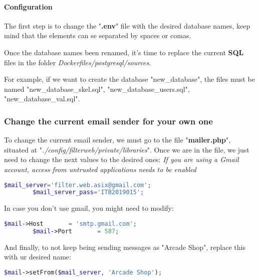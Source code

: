 \paragraph{Configuration}
\begin{flushleft}
    The first step is to change the "\textbf{.env}" file with the desired database names, keep mind that the elements
    can se separated by spaces or comas.
    
    Once the database names been renamed, it's time to replace the current \textbf{SQL} files in the folder
    \textit{Dockerfiles/postgresql/sources}.
\end{flushleft}

\begin{flushleft}
    For example, if we want to create the database "new\_database", the files must be named "new\_database\_skel.sql",
    "new\_database\_users.sql", "new\_database\_val.sql".
\end{flushleft}




\newpage
\subsubsection[Change the current email sender for your own one]{Change the current email sender for your own one}
\begin{flushleft}
    To change the current email sender, we must go to the file "\textbf{mailer.php}", situated at "\textit{./config/filterweb/private/libraries}".
    Once we are in the file, we just need to change the next values to the desired ones:
    \textit{If you are using a Gmail account, access from untrusted applications needs to be enabled}
    \begin{lstlisting}[language=php,label={lst:mail_accounts}]
        $mail_server='filter.web.asix@gmail.com';
        $mail_server_pass='ITB2019015';
    \end{lstlisting}
    In case you don't use gmail, you might need to modify:
    \begin{lstlisting}[language=php,label={lst:mail_accounts2}]
        $mail->Host       = 'smtp.gmail.com';
        $mail->Port       = 587;
    \end{lstlisting}
    And finally, to not keep being sending messages as "Arcade Shop", replace this with ur desired name:
    \begin{lstlisting}[language=php,label={lst:mail_accounts3}]
        $mail->setFrom($mail_server, 'Arcade Shop');
    \end{lstlisting}


\end{flushleft}

